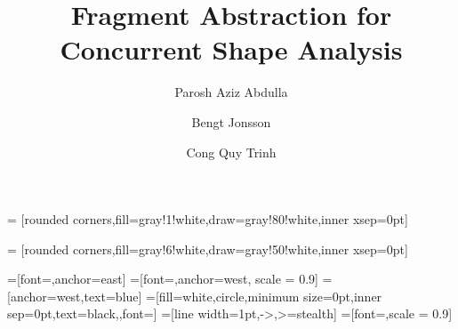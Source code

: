 \title{Fragment Abstraction for Concurrent Shape Analysis}

\author{Parosh Aziz Abdulla \and Bengt Jonsson \and Cong Quy Trinh
}


\usepackage{array}
\usepackage{dsfont,stmaryrd,listings,todonotes,color,pifont,stmaryrd,wrapfig,listings,verbatim,fancyvrb,textcomp,bbm}
\usepackage[ruled,noend,nofillcomment,linesnumbered]{algorithm2e}


\usepackage{pgf}
\usepackage{tikz}
\usepackage{mdframed}
\usepackage{caption}
\usepackage{paralist}
\usepackage{todonotes}
\usepackage{url}
\usepackage{wrapfig}
\usepackage{multirow}
\usepackage{times}
\usepackage{listings}
\lstset{language=C,numberstyle=\footnotesize,
basicstyle=\ttfamily\footnotesize
}


\usetikzlibrary{automata,positioning}
\usetikzlibrary{trees}
\usetikzlibrary{shapes}
\usetikzlibrary{petri}
\usetikzlibrary{arrows}
\usetikzlibrary{backgrounds}
\usetikzlibrary{calc}
\usetikzlibrary{fit}
\usetikzlibrary{decorations.pathmorphing}
\usetikzlibrary{decorations.text}
\usetikzlibrary{shapes.callouts}





=
[rounded corners,fill=gray!1!white,draw=gray!80!white,inner xsep=0pt]%


=
[rounded corners,fill=gray!6!white,draw=gray!50!white,inner xsep=0pt]%

  
=[font={\footnotesize\tt},anchor=east]
=[font={\footnotesize\tt},anchor=west, scale = 0.9]
=[anchor=west,text=blue]
=[fill=white,circle,minimum size=0pt,inner sep=0pt,text=black,,font=\tiny]
=[line width=1pt,->,>=stealth]
=[font=\small,scale = 0.9]









